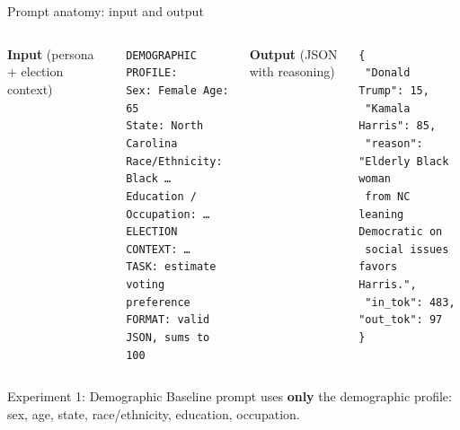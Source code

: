 \documentclass[aspectratio=169,11pt]{beamer}
\begin{document}
	\begin{frame}{Prompt anatomy: input and output}
		\begin{columns}[T]
			\textbf{Input} \; \footnotesize(persona + election context)
			\vspace{0.2em}
			\begin{block}{}
				\scriptsize
				\texttt{DEMOGRAPHIC PROFILE:}\\
				\texttt{Sex: Female \quad Age: 65}\\
				\texttt{State: North Carolina}\\
				\texttt{Race/Ethnicity: Black \quad \dots}\\
				\texttt{Education / Occupation: \dots}\\[0.4em]
				\texttt{ELECTION CONTEXT: \dots}\\
				\texttt{TASK: estimate voting preference}\\
				\texttt{FORMAT: valid JSON, sums to 100}
			\end{block}
			
			\column{0.5\textwidth}
			\textbf{Output} \; \footnotesize(JSON with reasoning)
			\vspace{0.2em}
			\begin{block}{}
				\scriptsize
				\texttt{\{}\\
				\texttt{\ "Donald Trump": 15,}\\
				\texttt{\ "Kamala Harris": 85,}\\
				\texttt{\ "reason": "Elderly Black woman}\\
				\texttt{\ from NC leaning Democratic on}\\
				\texttt{\ social issues favors Harris.",}\\
				\texttt{\ "in\_tok": 483, "out\_tok": 97}\\
				\texttt{\}}
			\end{block}
		\end{columns}
	\end{frame}
	
	\begin{frame}{Experiment 1: Demographic}
		Baseline prompt uses \textbf{only} the demographic profile:
		sex, age, state, race/ethnicity, education, occupation.
	\end{frame}
	
\end{document}
